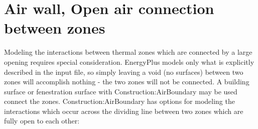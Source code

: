 \section{Air wall, Open air connection between zones}\label{air-wall-open-air-connection-between-zones}

Modeling the interactions between thermal zones which are connected by a large opening requires special consideration. EnergyPlus models only what is explicitly described in the input file, so simply leaving a void (no surfaces) between two zones will accomplish nothing - the two zones will not be connected. A building surface or fenestration surface with Construction:AirBoundary may be used connect the zones. Construction:AirBoundary has options for modeling the interactions which occur across the dividing line between two zones which are fully open to each other:

